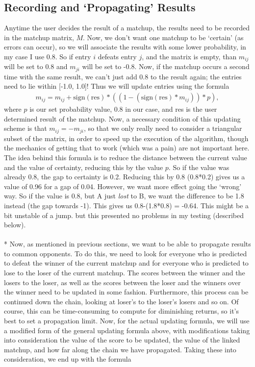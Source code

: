 \documentclass[11pt]{article}
\begin{document}
\subsection{Recording and `Propagating' Results}
\noindent Anytime the user decides the result of a matchup, the results need to be recorded in the matchup matrix, $M$. Now, we don't want one matchup to be `certain' (as errors can occur), so we will associate the results with some lower probability, in my case I use 0.8. So if entry $i$ defeats entry $j$, and the matrix is empty, than $m_{ij}$ will be set to 0.8 and $m_{ji}$ will be set to -0.8. Now, if the matchup occurs a second time with the same result, we can't just add 0.8 to the result again; the entries need to lie within [-1.0, 1.0]! Thus we will update entries using the formula
\begin{align}
m_{ij} = m_{ij} +\textrm{sign}(\textrm{res})*\left(\left(1-\left(\textrm{sign}(\textrm{res})*m_{ij}  \right)\right) * p\right),
\end{align} 
\noindent where $p$ is our set probability value, 0.8 in our case, and res is the user determined result of the matchup. Now, a necessary condition of this updating scheme is that $m_{ij} = -m_{ji}$, so that we only really need to consider a triangular subset of the matrix, in order to speed up the execution of the algorithm, though the mechanics of getting that to work (which was a pain) are not important here. The idea behind this formula is to reduce the distance between the current value and the value of certainty, reducing this by the value $p$. So if the value was already 0.8, the gap to certainty is 0.2. Reducing this by 0.8 (0.8*0.2) gives us a value of 0.96 for a gap of 0.04. However, we want more effect going the `wrong' way. So if the value is 0.8, but A just \emph{lost} to B, we want the difference to be 1.8 instead (the gap towards -1). This gives us 0.8-(1.8*0.8) = -0.64. This might be a bit unstable of a jump. but this presented no problems in my testing (described below).
\\
\\* Now, as mentioned in previous sections, we want to be able to propagate results to common opponents. To do this, we need to look for everyone who is predicted to defeat the winner of the current matchup and for everyone who is predicted to lose to the loser of the current matchup. The scores between the winner and the losers to the loser, as well as the scores between the loser and the winners over the winner need to be updated in some fashion. Furthermore, this process can be continued down the chain, looking at loser's to the loser's losers and so on. Of course, this can be time-consuming to compute for diminishing returns, so it's best to set a propagation limit. Now, for the actual updating formula, we will use a modified form of the general updating formula above, with modifications taking into consideration the value of the score to be updated, the value of the linked matchup, and how far along the chain we have propagated. Taking these into consideration, we end up with the formula
\end{document}
